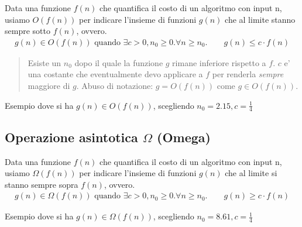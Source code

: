 \documentclass{article}
\begin{document}
Data una funzione $f(n)$ che quantifica il costo di un algoritmo con input n, usiamo
$O(f(n))$ per indicare l'insieme di funzioni $g(n)$ che al limite stanno sempre sotto $f(n)$, ovvero. 
\begin{align*}
g(n) \in O(f(n)) \text{ quando } \exists c > 0, n_0 \geq 0. \forall n \geq n_0. \qquad g(n) \leq c \cdot f(n)
\end{align*}

\begin{quote}
  Esiste un $n_0$ dopo il quale la funzione $g$ rimane inferiore rispetto a $f$.
  $c$ e' una costante che eventualmente devo applicare a $f$ per renderla \emph{sempre} maggiore di $g$.
  Abuso di notazione: $g = O(f(n))$ come $g \in O(f(n))$.
\end{quote}

Esempio dove si ha $g(n) \in O(f(n))$, scegliendo $n_0 = 2.15, c = \frac{1}{4}$

\begin{center}
\end{center}

\subsection{Operazione asintotica $\Omega$ (Omega)}

Data una funzione $f(n)$ che quantifica il costo di un algoritmo con input n, usiamo
$\Omega(f(n))$ per indicare l'insieme di funzioni $g(n)$ che al limite si stanno sempre sopra $f(n)$, ovvero. 
\begin{align*}
g(n) \in \Omega(f(n)) \text{ quando } \exists c > 0, n_0 \geq 0. \forall n \geq n_0. \qquad g(n) \geq c \cdot f(n)
\end{align*}

Esempio dove si ha $g(n) \in \Omega(f(n))$, scegliendo $n_0 = 8.61, c = \frac{1}{4}$
\end{document}
